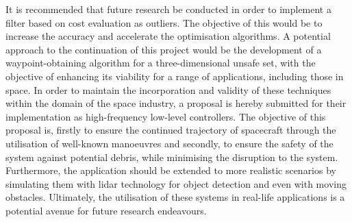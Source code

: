 
It is recommended that future research be conducted in order to implement a filter based on cost evaluation as outliers. The objective of this would be to increase the accuracy and accelerate the optimisation algorithms.
A potential approach to the continuation of this project would be the development of a waypoint-obtaining algorithm for a three-dimensional unsafe set, with the objective of enhancing its viability for a range of applications, including those in space. 
In order to maintain the incorporation and validity of these techniques within the domain of the space industry, a proposal is hereby submitted for their implementation as high-frequency low-level controllers. The objective of this proposal is, firstly to ensure the continued trajectory of spacecraft through the utilisation of well-known manoeuvres and secondly, to ensure the safety of the system against potential debris, while minimising the disruption to the system.  
Furthermore, the application should be extended to more realistic scenarios by simulating them with lidar technology for object detection and even with moving obstacles.
Ultimately, the utilisation of these systems in real-life applications is a potential avenue for future research endeavours. 